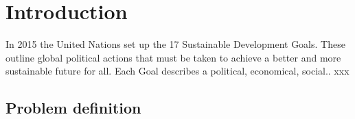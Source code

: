 \section{Introduction} \label{sec:intro}
In 2015 the United Nations set up the 17 Sustainable Development Goals. These outline global political actions that must be taken to achieve a better and more sustainable future for all. Each Goal describes a political, economical, social.. xxx


\subsection{Problem definition}

